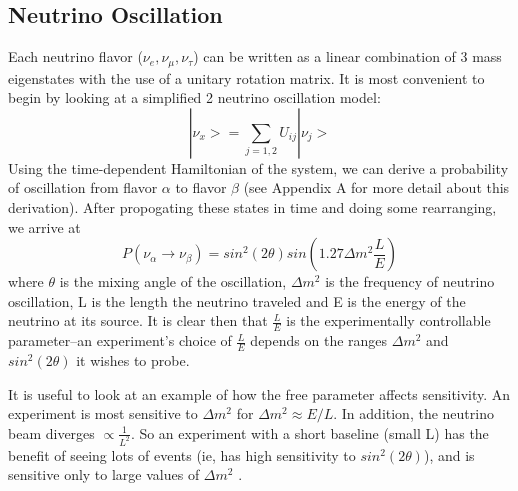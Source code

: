 \documentclass[12pt]{article}
\begin{document}
\subsection{Neutrino Oscillation}
\par Each neutrino flavor ($\nu_e, \nu_\mu, \nu_\tau$) can be written as a linear combination of 3 mass eigenstates with the use of a unitary rotation matrix. It is most convenient to begin by looking at a simplified 2 neutrino oscillation model:
\begin{equation} \label{eq:eig}
|\nu_x> = \sum_{j=1,2} U_{ij} |\nu_j>  
\end{equation}
Using the time-dependent Hamiltonian of the system, we can derive a probability of oscillation from flavor $\alpha$ to flavor $\beta$ (see Appendix A for more detail about this derivation).  After propogating these states in time and doing some rearranging, we arrive at 
\begin{equation} \label{eq:prob}
P(\nu_\alpha \rightarrow \nu_\beta) = sin^2(2\theta)sin(1.27\Delta m^2  \frac{L}{E})
\end{equation}
where $\theta$ is the mixing angle of the oscillation, $\Delta m^2$ is the frequency of neutrino oscillation, L is the length the neutrino traveled and E is the energy of the neutrino at its source.  It is clear then that $\frac{L}{E}$ is the experimentally controllable parameter--an experiment's choice of $\frac{L}{E}$ depends on the ranges $\Delta m^2$ and $sin^2(2\theta)$ it wishes to probe. 
\par It is useful to look at an example of how the free parameter affects sensitivity.  An experiment is most sensitive to $\Delta m^2$ for $\Delta m^2 \approx E/L$.  In addition, the neutrino beam diverges $\propto \frac{1}{L^2}$.  So an experiment with a short baseline (small L) has the benefit of seeing lots of events (ie, has high sensitivity to $sin^2(2\theta)$), and is sensitive only to large values of $\Delta m^2$ \cite{warwick}. 
\end{document}
